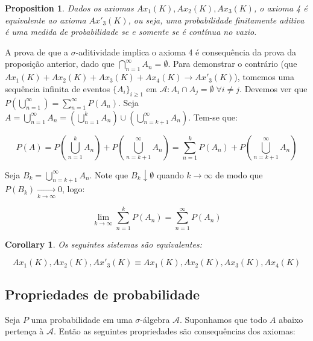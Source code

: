 \documentclass[
]{article}
\newtheorem{corollary}{Corollary}[section]
\newtheorem{proposition}{Proposition}[section]
\theoremstyle{definition}
\theoremstyle{definition}
\theoremstyle{definition}
\theoremstyle{definition}
\theoremstyle{remark}
\begin{document}
\begin{proposition}
\protect\hypertarget{prp:axiomas}{}\label{prp:axiomas}Dados os axiomas \(Ax_{1}(K),Ax_{2}(K),Ax_{3}(K)\), o axioma 4 é equivalente ao axioma \(Ax'_{3}(K)\), ou seja, uma probabilidade finitamente aditiva é uma medida de probabilidade se e somente se é contínua no vazio.
\end{proposition}

A prova de que a \(\sigma\)-aditividade implica o axioma 4 é consequência da prova da proposição anterior, dado que \(\bigcap_{n=1}^{\infty}A_{n} = \emptyset\). Para demonstrar o contrário (que \(Ax_{1}(K) + Ax_{2}(K) + Ax_{3}(K) + Ax_{4}(K) \rightarrow Ax'_{3}(K)\)), tomemos uma sequência infinita de eventos \(\{A_{i}\}_{i \ge 1}\) em \(\mathcal{A} : A_{i} \cap A_{j} = \emptyset \; \forall i \neq j\). Devemos ver que \(P(\bigcup_{n=1}^{\infty}) = \sum_{n=1}^{\infty}P(A_{n})\). Seja \(A = \bigcup_{n=1}^{\infty}A_{n} = (\bigcup_{n=1}^{k}A_{n}) \cup (\bigcup_{n=k+1}^{\infty}A_{n})\). Tem-se que:

\begin{equation*}
P(A) = P\left(\bigcup_{n=1}^{k}A_{n}\right) + P\left(\bigcup_{n=k+1}^{\infty}A_{n}\right) = \sum_{n=1}^{k}P(A_{n}) +P\left(\bigcup_{n=k+1}^{\infty}A_{n}\right)
\end{equation*}

Seja \(B_{k} = \bigcup_{n=k+1}^{\infty}A_{n}\). Note que \(B_{k} \downarrow \emptyset\) quando \(k \to \infty\) de modo que \(P(B_{k})\xrightarrow[k \to \infty]{}0\), logo:

\begin{equation*}
\lim_{k \to \infty}\sum_{n=1}^{k}P(A_{n}) = \sum_{n=1}^{\infty}P(A_{n})
\end{equation*}

\begin{corollary}
Os seguintes sistemas são equivalentes:

\begin{equation*}
Ax_{1}(K),Ax_{2}(K),Ax'_{3}(K) \equiv Ax_{1}(K),Ax_{2}(K),Ax_{3}(K),Ax_{4}(K)
\end{equation*}
\end{corollary}

\hypertarget{propriedades-de-probabilidade}{%
\subsection{Propriedades de probabilidade}\label{propriedades-de-probabilidade}}

Seja \(P\) uma probabilidade em uma \(\sigma\)-álgebra \(\mathcal{A}\). Suponhamos que todo \(A\) abaixo pertença à \(\mathcal{A}\). Então as seguintes propriedades são consequências dos axiomas:
\end{document}
